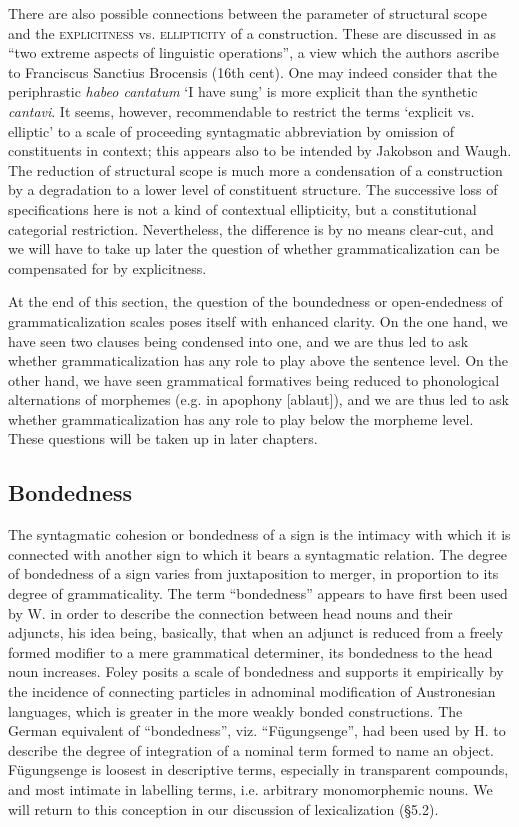 There are also possible connections between the parameter of structural scope and the \textsc{explicitness} vs. \textsc{ellipticity} of a construction. These are discussed in \citet[6f]{JakobsonEtAl1979} as “two extreme aspects of linguistic operations”, a view which the authors ascribe to Franciscus Sanctius Brocensis (16th cent). One may indeed consider that the periphrastic \textit{habeo cantatum} ‘I have sung’ is more explicit than the synthetic \textit{cantavi}. It seems, however, recommendable to restrict the terms ‘explicit vs. elliptic’ to a scale of proceeding syntagmatic abbreviation by omission of constituents in context; this appears also to be intended by Jakobson and Waugh. The reduction of structural scope is much more a condensation of a construction by a degradation to a lower level of constituent structure. The successive loss of specifications here is not a kind of contextual ellipticity, but a constitutional categorial restriction. Nevertheless, the difference is by no means clear-cut, and we will have to take up later the question of whether grammaticalization can be compensated for by explicitness.

At the end of this section, the question of the boundedness or open-endedness of grammaticalization scales poses itself with enhanced clarity. On the one hand, we have seen two clauses being condensed into one, and we are thus led to ask whether grammaticalization has any role to play above the sentence level. On the other hand, we have seen grammatical formatives being reduced to phonological alternations of morphemes (e.g. in apophony [ablaut]), and we are thus led to ask whether grammaticalization has any role to play below the morpheme level. These questions will be taken up in later chapters.

\subsection{Bondedness}\label{sec:4.3.2}

The syntagmatic cohesion or bondedness of a sign is the intimacy with which it is connected with another sign to which it bears a syntagmatic relation. The degree of bondedness of a sign varies from juxtaposition to merger, in proportion to its degree of grammaticality. The term ``bondedness'' appears to have first been used by W. \citet{Foley1980} in order to describe the connection between head nouns and their adjuncts, his idea being, basically, that when an adjunct is reduced from a freely formed modifier to a mere grammatical determiner, its bondedness to the head noun increases. Foley posits a scale of bondedness and supports it empirically by the incidence of connecting particles in adnominal modification of Austronesian languages, which is greater in the more weakly bonded constructions. The German equivalent of ``bondedness'', viz. ``Fügungsenge'', had been used by H. \citet{Seiler1975} to describe the degree of integration of a nominal term formed to name an object. Fügungsenge is loosest in descriptive terms, especially in transparent compounds, and most intimate in labelling terms, i.e. arbitrary monomorphemic nouns. We will return to this conception in our discussion of lexicalization (§5.2).

